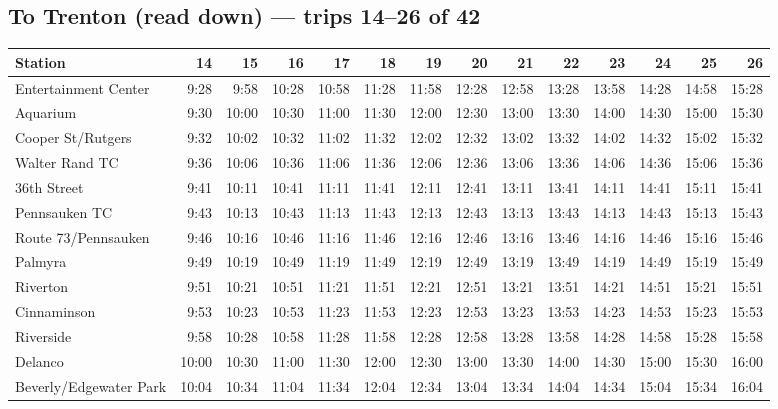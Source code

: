 \subsection*{To Trenton (read down) --- trips 14--26 of 42}
\begin{center}\footnotesize\setlength{\tabcolsep}{3pt}\begin{tabular}{@{}lrrrrrrrrrrrrr@{}}\toprule
Station & 14 & 15 & 16 & 17 & 18 & 19 & 20 & 21 & 22 & 23 & 24 & 25 & 26 \\\midrule
Entertainment Center & 9:28 & 9:58 & 10:28 & 10:58 & 11:28 & 11:58 & 12:28 & 12:58 & 13:28 & 13:58 & 14:28 & 14:58 & 15:28 \\
Aquarium & 9:30 & 10:00 & 10:30 & 11:00 & 11:30 & 12:00 & 12:30 & 13:00 & 13:30 & 14:00 & 14:30 & 15:00 & 15:30 \\
Cooper St/Rutgers & 9:32 & 10:02 & 10:32 & 11:02 & 11:32 & 12:02 & 12:32 & 13:02 & 13:32 & 14:02 & 14:32 & 15:02 & 15:32 \\
Walter Rand TC & 9:36 & 10:06 & 10:36 & 11:06 & 11:36 & 12:06 & 12:36 & 13:06 & 13:36 & 14:06 & 14:36 & 15:06 & 15:36 \\
36th Street & 9:41 & 10:11 & 10:41 & 11:11 & 11:41 & 12:11 & 12:41 & 13:11 & 13:41 & 14:11 & 14:41 & 15:11 & 15:41 \\
Pennsauken TC & 9:43 & 10:13 & 10:43 & 11:13 & 11:43 & 12:13 & 12:43 & 13:13 & 13:43 & 14:13 & 14:43 & 15:13 & 15:43 \\
Route 73/Pennsauken & 9:46 & 10:16 & 10:46 & 11:16 & 11:46 & 12:16 & 12:46 & 13:16 & 13:46 & 14:16 & 14:46 & 15:16 & 15:46 \\
Palmyra & 9:49 & 10:19 & 10:49 & 11:19 & 11:49 & 12:19 & 12:49 & 13:19 & 13:49 & 14:19 & 14:49 & 15:19 & 15:49 \\
Riverton & 9:51 & 10:21 & 10:51 & 11:21 & 11:51 & 12:21 & 12:51 & 13:21 & 13:51 & 14:21 & 14:51 & 15:21 & 15:51 \\
Cinnaminson & 9:53 & 10:23 & 10:53 & 11:23 & 11:53 & 12:23 & 12:53 & 13:23 & 13:53 & 14:23 & 14:53 & 15:23 & 15:53 \\
Riverside & 9:58 & 10:28 & 10:58 & 11:28 & 11:58 & 12:28 & 12:58 & 13:28 & 13:58 & 14:28 & 14:58 & 15:28 & 15:58 \\
Delanco & 10:00 & 10:30 & 11:00 & 11:30 & 12:00 & 12:30 & 13:00 & 13:30 & 14:00 & 14:30 & 15:00 & 15:30 & 16:00 \\
Beverly/Edgewater Park & 10:04 & 10:34 & 11:04 & 11:34 & 12:04 & 12:34 & 13:04 & 13:34 & 14:04 & 14:34 & 15:04 & 15:34 & 16:04 \\

\end{tabular}
\end{center}
